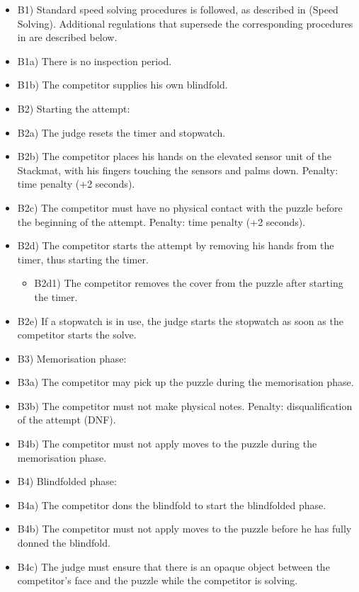\begin{itemize}
\item
  B1) Standard speed solving procedures is followed, as described in
  (Speed Solving). Additional regulations that supersede the
  corresponding procedures in are described below.
\item
  B1a) There is no inspection period.
\item
  B1b) The competitor supplies his own blindfold.
\item
  B2) Starting the attempt:
\item
  B2a) The judge resets the timer and stopwatch.
\item
  B2b) The competitor places his hands on the elevated sensor unit of
  the Stackmat, with his fingers touching the sensors and palms down.
  Penalty: time penalty (+2 seconds).
\item
  B2c) The competitor must have no physical contact with the puzzle
  before the beginning of the attempt. Penalty: time penalty (+2
  seconds).
\item
  B2d) The competitor starts the attempt by removing his hands from the
  timer, thus starting the timer.

  \begin{itemize}
  \item
    B2d1) The competitor removes the cover from the puzzle after
    starting the timer.
  \end{itemize}
\item
  B2e) If a stopwatch is in use, the judge starts the stopwatch as soon
  as the competitor starts the solve.
\item
  B3) Memorisation phase:
\item
  B3a) The competitor may pick up the puzzle during the memorisation
  phase.
\item
  B3b) The competitor must not make physical notes. Penalty:
  disqualification of the attempt (DNF).
\item
  B4b) The competitor must not apply moves to the puzzle during the
  memorisation phase.
\item
  B4) Blindfolded phase:
\item
  B4a) The competitor dons the blindfold to start the blindfolded phase.
\item
  B4b) The competitor must not apply moves to the puzzle before he has
  fully donned the blindfold.
\item
  B4c) The judge must ensure that there is an opaque object between the
  competitor's face and the puzzle while the competitor is solving.


\end{itemize}
